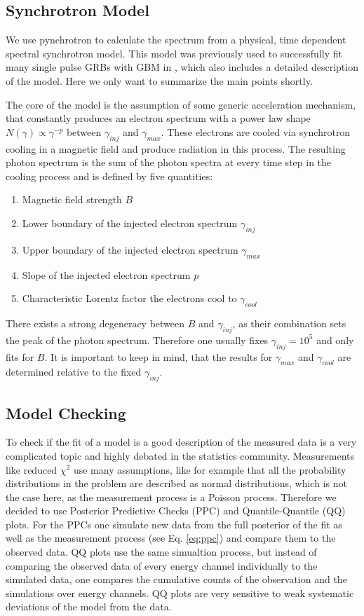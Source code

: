 \documentclass[twocolumn]{aa}
\begin{document}
\subsection{Synchrotron Model}
\label{synch}
We use pynchrotron to calculate the spectrum from a physical, time dependent spectral synchrotron model. This model was previously used to successfully fit many single pulse GRBs with GBM in \citet{synch}, which also includes a detailed description of the model. Here we only want to summarize the main points shortly.

The core of the model is the assumption of some generic acceleration mechanism, that constantly produces an electron spectrum with a power law shape $N(\gamma )\propto \gamma^{-p}$ between $\gamma_{inj}$ and $\gamma_{max}$. These electrons are cooled via synchrotron cooling in a magnetic field and produce radiation in this process. The resulting photon spectrum is the sum of the photon spectra at every time step in the cooling process and is defined by five quantities:

\begin{enumerate}
	\item Magnetic field strength $B$
  \item Lower boundary of the injected electron spectrum $\gamma_{inj}$
  \item Upper boundary of the injected electron spectrum $\gamma_{max}$
  \item Slope of the injected electron spectrum $p$
  \item Characteristic Lorentz factor the electrons cool to $\gamma_{cool}$
\end{enumerate}

There exists a strong degeneracy between $B$ and $\gamma_{inj}$, as their combination sets the peak of the photon spectrum. Therefore one usually fixes $\gamma_{inj}=10^{5}$ and only fits for $B$. It is important to keep in mind, that the results for $\gamma_{max}$ and $\gamma_{cool}$ are determined relative to the fixed $\gamma_{inj}$.

\subsection{Model Checking}
\label{PPC}
To check if the fit of a model is a good description of the measured data is a very complicated topic and highly debated in the statistics community. Measurements like reduced $\chi^{2}$ use many assumptions, like for example that all the probability distributions in the problem are described as normal distributions, which is not the case here, as the measurement process is a Poisson process. Therefore we decided to use Posterior Predictive Checks (PPC) and Quantile-Quantile (QQ) plots. For the PPCs one simulate new data from the full posterior of the fit as well as the measurement process (see Eq. \ref{eq:ppc}) and compare them to the observed data. QQ plots use the same simualtion process, but instead of comparing the observed data of every energy channel individually to the simulated data, one compares the cumulative counts of the observation and the simulations over energy channels. QQ plots are very sensitive to weak systematic deviations of the model from the data. \citep{QQ,ppc}
\end{document}
